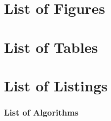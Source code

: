 \cleardoublepage


\chapter{List of Figures}
\vspace{-0.3cm}
\makeatletter
{}%
\makeatother
\cleardoublepage

	
	
\chapter{List of Tables}
\makeatletter
{}%
\makeatother
\clearpage



\chapter{List of Listings}
\begingroup
\renewcommand{\lstlistlistingname}{}
\let\chapter\subsection
\lstlistoflistings
\endgroup

\chapter{List of Algorithms}
\begingroup
\renewcommand{\listalgorithmname}{}
\let\chapter\subsection%
\listofalgorithms
\endgroup
